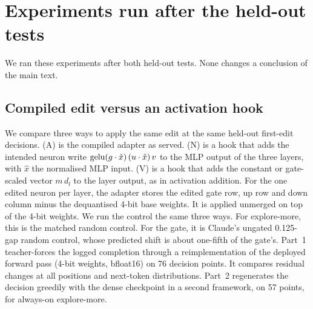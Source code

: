 \section{Experiments run after the held-out tests}
\label{app:followup}
We ran these experiments after both held-out tests. None changes a conclusion of the main text.

\subsection{Compiled edit versus an activation hook}
\label{app:hook}
We compare three ways to apply the same edit at the same held-out first-edit decisions. (A) is the compiled adapter as served. (N) is a hook that adds the intended neuron write $\mathrm{gelu}(g \cdot \hat{x})\,(u \cdot \hat{x})\, v$ to the MLP output of the three layers, with $\hat{x}$ the normalised MLP input. (V) is a hook that adds the constant or gate-scaled vector $m\, d_l$ to the layer output, as in activation addition. For the one edited neuron per layer, the adapter stores the edited gate row, up row and down column minus the dequantised 4-bit base weights. It is applied unmerged on top of the 4-bit weights. We run the control the same three ways. For explore-more, this is the matched random control. For the gate, it is Claude's ungated 0.125-gap random control, whose predicted shift is about one-fifth of the gate's. Part~1 teacher-forces the logged completion through a reimplementation of the deployed forward pass (4-bit weights, bfloat16) on 76 decision points. It compares residual changes at all positions and next-token distributions. Part~2 regenerates the decision greedily with the dense checkpoint in a second framework, on 57 points, for always-on explore-more.

